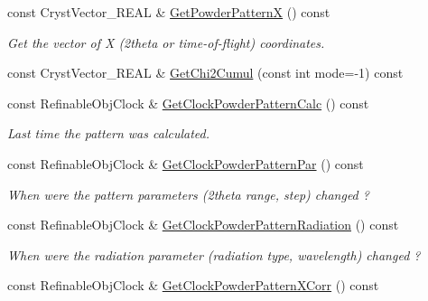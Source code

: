 \begin{DoxyCompactItemize}
const Cryst\+Vector\+\_\+\+R\+E\+AL \& \mbox{\hyperlink{class_obj_cryst_1_1_powder_pattern_a912aabc3b801566a93ca2caab2cc1c9c}{Get\+Powder\+PatternX}} () const
\begin{DoxyCompactList}\small\item\em Get the vector of X (2theta or time-\/of-\/flight) coordinates. \end{DoxyCompactList}\item 
const Cryst\+Vector\+\_\+\+R\+E\+AL \& \mbox{\hyperlink{class_obj_cryst_1_1_powder_pattern_a9da47365d83b105f22c006bd7145ed23}{Get\+Chi2\+Cumul}} (const int mode=-\/1) const
\item 
\mbox{\label{class_obj_cryst_1_1_powder_pattern_acdbd4327d06a21b48dfaa9ce794d6db8}} 
const Refinable\+Obj\+Clock \& \mbox{\hyperlink{class_obj_cryst_1_1_powder_pattern_acdbd4327d06a21b48dfaa9ce794d6db8}{Get\+Clock\+Powder\+Pattern\+Calc}} () const
\begin{DoxyCompactList}\small\item\em Last time the pattern was calculated. \end{DoxyCompactList}\item 
\mbox{\label{class_obj_cryst_1_1_powder_pattern_a2c6b24bb1e7ea2f6fd4ac61b9aea3afb}} 
const Refinable\+Obj\+Clock \& \mbox{\hyperlink{class_obj_cryst_1_1_powder_pattern_a2c6b24bb1e7ea2f6fd4ac61b9aea3afb}{Get\+Clock\+Powder\+Pattern\+Par}} () const
\begin{DoxyCompactList}\small\item\em When were the pattern parameters (2theta range, step) changed ? \end{DoxyCompactList}\item 
\mbox{\label{class_obj_cryst_1_1_powder_pattern_ae53ee06cec10fd47ee9b94cb9ef19273}} 
const Refinable\+Obj\+Clock \& \mbox{\hyperlink{class_obj_cryst_1_1_powder_pattern_ae53ee06cec10fd47ee9b94cb9ef19273}{Get\+Clock\+Powder\+Pattern\+Radiation}} () const
\begin{DoxyCompactList}\small\item\em When were the radiation parameter (radiation type, wavelength) changed ? \end{DoxyCompactList}\item 
const Refinable\+Obj\+Clock \& \mbox{\hyperlink{class_obj_cryst_1_1_powder_pattern_af90dc3f2baa8c13f811ecf119cc49c95}{Get\+Clock\+Powder\+Pattern\+X\+Corr}} () const

\end{DoxyCompactItemize}
